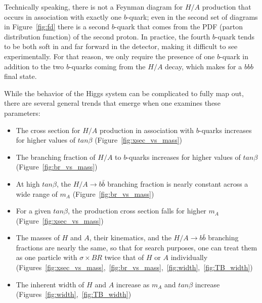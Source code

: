 Technically speaking, there is not a Feynman diagram for $H/A$ production that occurs in association with exactly one $b$-quark; even in the second set of diagrams in Figure~\ref{fig:fd} there is a second $b$-quark that comes from the PDF (parton distribution function) of the second proton.  In practice, the fourth $b$-quark tends to be both soft in \pt and far forward in the detector, making it difficult to see experimentally.  For that reason, we only require the presence of one $b$-quark in addition to the two $b$-quarks coming from the $H/A$ decay, which makes for a $bbb$ final state.



While the behavior of the Higgs system can be complicated to fully map out, there are several general trends that emerge when one examines these parameters:

\begin{itemize}
	\item The cross section for $H/A$ production in association with $b$-quarks increases for higher values of $tan\beta$ (Figure~\ref{fig:xsec_vs_mass})
	\item The branching fraction of $H/A$ to $b$-quarks increases for higher values of $tan\beta$ (Figure~\ref{fig:br_vs_mass})
	\item At high $tan\beta$, the $H/A\rightarrow b\bar{b}$ branching fraction is nearly constant across a wide range of $m_A$ (Figure~\ref{fig:br_vs_mass})
	\item For a given $tan\beta$, the production cross section falls for higher $m_A$ (Figure~\ref{fig:xsec_vs_mass})
	\item The masses of $H$ and $A$, their kinematics, and the $H/A\rightarrow b\bar{b}$ branching fractions are nearly the same, so that for search purposes, one can treat them as one particle with $\sigma \times BR$ twice that of $H$ or $A$ individually (Figures~\ref{fig:xsec_vs_mass},~\ref{fig:br_vs_mass},~\ref{fig:width},~\ref{fig:TB_width})
	\item The inherent width of $H$ and $A$ increase as $m_A$ and $tan\beta$ increase (Figures~\ref{fig:width},~\ref{fig:TB_width})
\end{itemize}





